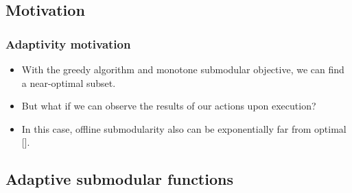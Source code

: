 \documentclass[handout]{beamer}
\begin{document}
\subsection{Motivation}

\begin{frame}\frametitle{Adaptivity motivation}
\begin{itemize}
    \item With the greedy algorithm and monotone submodular objective, we can find a near-optimal subset.
    \pause
    \item But what if we can observe the results of our actions upon execution?
    \pause
    \item In this case, offline submodularity also can be exponentially far from optimal [\cite{DBLP:journals/corr/abs-1106-5829}].
\end{itemize}
\centering
{}
\end{frame}

\subsection[Adaptive Submod.]{Adaptive submodular functions}
\end{document}
